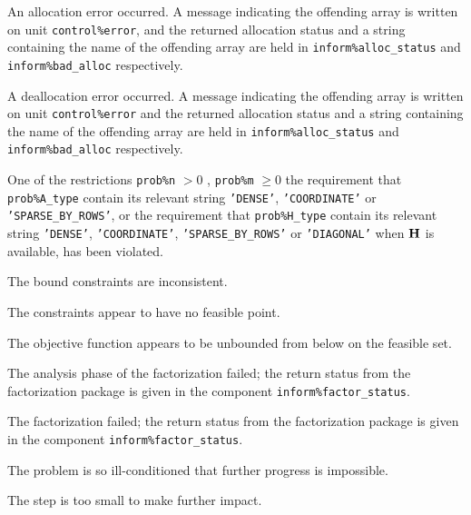 \documentclass{galahad}
\begin{document}
\begin{description}

 An allocation error occurred. A message indicating
the offending
array is written on unit {\tt control\%error}, and the returned allocation
status and a string containing the name of the offending array
are held in {\tt inform\%alloc\_\-status}
and {\tt inform\%bad\_alloc} respectively.

 A deallocation error occurred.
A message indicating the offending
array is written on unit {\tt control\%error} and the returned allocation
status and a string containing the name of the offending array
are held in {\tt inform\%alloc\_\-status}
and {\tt inform\%bad\_alloc} respectively.

 One of the restrictions
 {\tt prob\%n} $> 0$ ,  {\tt prob\%m} $\geq 0$
    the requirement that {\tt prob\%A\_type} contain its relevant string
    {\tt 'DENSE'}, {\tt 'COORDINATE'} or {\tt 'SPARSE\_BY\_ROWS'},
    or the requirement that
    {\tt prob\%H\_type} contain its relevant string
    {\tt 'DENSE'}, {\tt 'COORDINATE'}, {\tt 'SPARSE\_BY\_ROWS'}
    or {\tt 'DIAGONAL'} when ${\mathbf{H}}$ is available,
    has been violated.


 The bound constraints are inconsistent.

 The constraints appear to have no feasible point.

 The objective function appears to be unbounded
  from below on the feasible set.

 The analysis phase of the factorization failed;
  the return status from the factorization
    package is given in the component {\tt inform\%fac\-t\-or\_status}.

 The factorization failed; the return status
  from the factorization
    package is given in the component {\tt inform\%fac\-t\-or\_status}.

 The problem is so ill-conditioned that
 further progress is impossible.

 The step is too small to make further impact.


\end{description}
\end{document}
